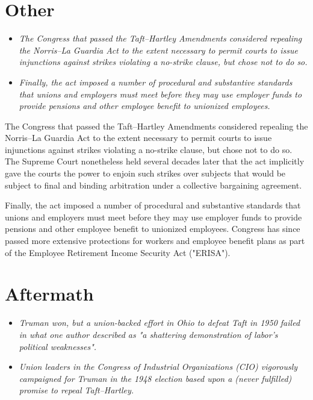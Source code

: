 \section{Other}\label{other}

\begin{itemize}
\item
  \emph{The Congress that passed the Taft--Hartley Amendments considered
  repealing the Norris--La Guardia Act to the extent necessary to permit
  courts to issue injunctions against strikes violating a no-strike
  clause, but chose not to do so.}
\item
  \emph{Finally, the act imposed a number of procedural and substantive
  standards that unions and employers must meet before they may use
  employer funds to provide pensions and other employee benefit to
  unionized employees.}
\end{itemize}

The Congress that passed the Taft--Hartley Amendments considered
repealing the Norris--La Guardia Act to the extent necessary to permit
courts to issue injunctions against strikes violating a no-strike
clause, but chose not to do so. The Supreme Court nonetheless held
several decades later that the act implicitly gave the courts the power
to enjoin such strikes over subjects that would be subject to final and
binding arbitration under a collective bargaining agreement.

Finally, the act imposed a number of procedural and substantive
standards that unions and employers must meet before they may use
employer funds to provide pensions and other employee benefit to
unionized employees. Congress has since passed more extensive
protections for workers and employee benefit plans as part of the
Employee Retirement Income Security Act ("ERISA").

\section{Aftermath}\label{aftermath}

\begin{itemize}
\item
  \emph{Truman won, but a union-backed effort in Ohio to defeat Taft in
  1950 failed in what one author described as "a shattering
  demonstration of labor's political weaknesses".}
\item
  \emph{Union leaders in the Congress of Industrial Organizations (CIO)
  vigorously campaigned for Truman in the 1948 election based upon a
  (never fulfilled) promise to repeal Taft--Hartley.}
\end{itemize}

